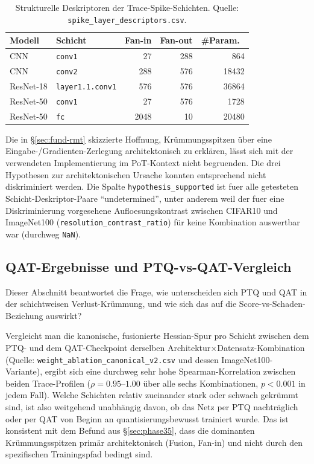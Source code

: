 \begin{table}[t]
\centering
\footnotesize
\caption{Strukturelle Deskriptoren der Trace-Spike-Schichten. Quelle: \texttt{spike\_layer\_descriptors.csv}.}
\label{tab:descriptors}
\begin{tabular}{p{1.55cm}p{1.75cm}rrr}
\toprule
Modell & Schicht & Fan-in & Fan-out & \#Param.\ \\
\midrule
CNN & \texttt{conv1} & 27 & 288 & 864 \\
CNN & \texttt{conv2} & 288 & 576 & 18432 \\
ResNet-18 & \texttt{layer1.1.\allowbreak conv1} & 576 & 576 & 36864 \\
ResNet-50 & \texttt{conv1} & 27 & 576 & 1728 \\
ResNet-50 & \texttt{fc} & 2048 & 10 & 20480 \\
\bottomrule
\end{tabular}
\end{table}

Die in \S\ref{sec:fund-rmt} skizzierte Hoffnung, Krümmungsspitzen über eine Eingabe-/Gradienten-Zerlegung architektonisch zu erklären, lässt sich mit der verwendeten Implementierung im PoT-Kontext nicht begruenden. Die drei Hypothesen zur architektonischen Ursache konnten entsprechend nicht diskriminiert werden. Die Spalte \texttt{hypothesis\_supported} ist fuer alle getesteten Schicht-Deskriptor-Paare \enquote{undetermined}, unter anderem weil der fuer eine Diskriminierung vorgesehene Aufloesungskontrast zwischen CIFAR10 und ImageNet100 (\texttt{resolution\_contrast\_ratio}) für keine Kombination auswertbar war (durchweg \texttt{NaN}).

\subsection{QAT-Ergebnisse und PTQ-vs-QAT-Vergleich}
\label{sec:phase9}

Dieser Abschnitt beantwortet die Frage, wie unterscheiden sich PTQ und QAT in der schichtweisen Verlust-Krümmung, und wie sich das auf die Score-vs-Schaden-Beziehung auswirkt?

Vergleicht man die kanonische, fusionierte Hessian-Spur pro Schicht zwischen dem PTQ- und dem QAT-Checkpoint derselben Architektur$\times$Datensatz-Kombination (Quelle: \texttt{weight\_ablation\_canonical\_v2.csv} und dessen ImageNet100-Variante), ergibt sich eine durchweg sehr hohe Spearman-Korrelation zwischen beiden Trace-Profilen ($\rho=0.95$--$1.00$ über alle sechs Kombinationen, $p<0.001$ in jedem Fall). Welche Schichten relativ zueinander stark oder schwach gekrümmt sind, ist also weitgehend unabhängig davon, ob das Netz per PTQ nachträglich oder per QAT von Beginn an quantisierungsbewusst trainiert wurde. Das ist konsistent mit dem Befund aus \S\ref{sec:phase35}, dass die dominanten Krümmungsspitzen primär architektonisch (Fusion, Fan-in) und nicht durch den spezifischen Trainingspfad bedingt sind.

